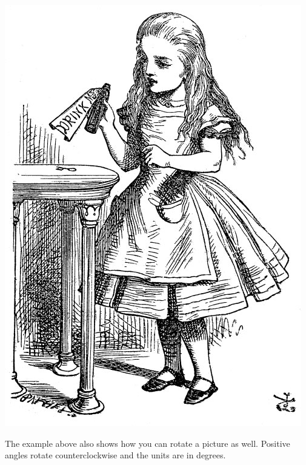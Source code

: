 \documentclass{article}
\newcommand{\nid}{\noindent} %
\begin{document}
\includegraphics[angle = -30, scale=0.15]{alice}

\nid The example above also shows how you can rotate a picture as well.  Positive angles rotate counterclockwise and the units are in degrees.
\end{document}
